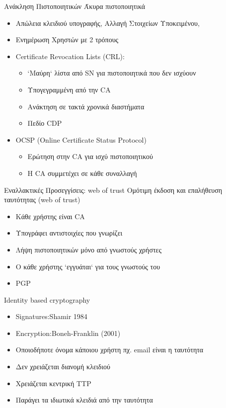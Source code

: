 \documentclass{beamer}
\begin{document}
\begin{frame}{Ανάκληση Πιστοποιητικών}
Άκυρα πιστοποιητικά
\begin{itemize}
\item Απώλεια κλειδιού υπογραφής, Αλλαγή Στοιχείων Υποκειμένου, 
\pause
\item Ενημέρωση Χρηστών με 2 τρόπους
\pause
\item Certificate Revocation Lists (CRL): 
\begin{itemize}
    \item `Μαύρη` λίστα από SN για πιστοποιητικά που δεν ισχύουν
    \item Υπογεγραμμένη από την CA
    \item Ανάκτηση σε τακτά χρονικά διαστήματα
    \item Πεδίο CDP 
\end{itemize}
\pause
\item OCSP (Online Certificate Status Protocol)
\begin{itemize}
    \item Ερώτηση στην CA για ισχύ πιστοποιητικού
    \item H CA συμμετέχει σε κάθε συναλλαγή
\end{itemize}
\end{itemize}
\end{frame}

\begin{frame}{Εναλλακτικές Προσεγγίσεις: web of trust}
Ομότιμη έκδοση και επαλήθευση ταυτότητας (web of trust)
\begin{itemize}
    \item Κάθε χρήστης είναι CA \pause
    \item Υπογράφει αντιστοιχίες που γνωρίζει \pause
    \item Λήψη πιστοποιητικών μόνο από γνωστούς χρήστες \pause
    \item O κάθε χρήστης `εγγυάται` για τους γνωστούς του \pause
    \item PGP
\end{itemize}
\end{frame}

\begin{frame}{Identity based cryptography}
\begin{itemize}
    \item Signatures:Shamir 1984 \pause
    \item Encryption:Boneh-Franklin (2001) \pause
    \item Οποιοδήποτε όνομα κάποιου χρήστη πχ. email είναι η ταυτότητα \pause
    \item Δεν χρειάζεται διανομή κλειδιού \pause
    \item Χρειάζεται κεντρική TTP \pause
    \item Παράγει τα ιδιωτικά κλειδιά από την ταυτότητα \pause
\end{itemize}
\end{frame}
\end{document}
